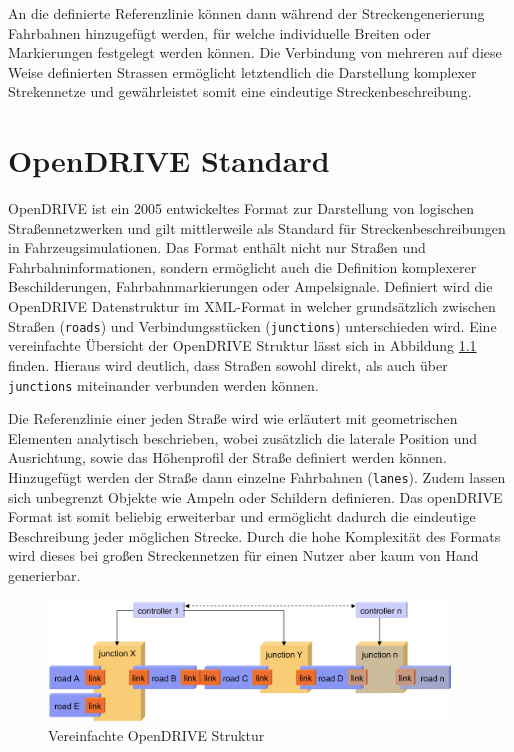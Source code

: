 An die definierte Referenzlinie können dann während der Streckengenerierung Fahrbahnen hinzugefügt werden, für welche individuelle Breiten oder Markierungen festgelegt werden können. Die Verbindung von mehreren auf diese Weise definierten Strassen ermöglicht letztendlich die Darstellung komplexer Strekennetze und gewährleistet somit eine eindeutige Streckenbeschreibung. 

\chapter{OpenDRIVE Standard}

OpenDRIVE ist ein 2005 entwickeltes Format zur Darstellung von logischen Straßennetzwerken und gilt mittlerweile als Standard für Streckenbeschreibungen in Fahrzeugsimulationen. Das Format enthält nicht nur Straßen und Fahrbahninformationen, sondern ermöglicht auch die Definition komplexerer Beschilderungen, Fahrbahnmarkierungen oder Ampelsignale. \cite{OpenDRIVE.2019} Definiert wird die OpenDRIVE Datenstruktur im XML-Format in welcher grundsätzlich zwischen Straßen (\texttt{roads}) und Verbindungsstücken (\texttt{junctions}) unterschieden wird. Eine vereinfachte Übersicht der OpenDRIVE Struktur lässt sich in Abbildung \ref{abb3} finden. Hieraus wird deutlich, dass Straßen sowohl direkt, als auch über \texttt{junctions} miteinander verbunden werden können. 

Die Referenzlinie einer jeden Straße wird wie erläutert mit geometrischen Elementen analytisch beschrieben, wobei zusätzlich die laterale Position und Ausrichtung, sowie das Höhenprofil der Straße definiert werden können. Hinzugefügt werden der Straße dann einzelne Fahrbahnen (\texttt{lanes}). Zudem lassen sich unbegrenzt Objekte wie Ampeln oder Schildern definieren. \cite{OpenDRIVEDoku.2019} Das openDRIVE Format ist somit beliebig erweiterbar und ermöglicht dadurch die eindeutige Beschreibung jeder möglichen Strecke. Durch die hohe Komplexität des Formats wird dieses bei großen Streckennetzen für einen Nutzer aber kaum von Hand generierbar.

\begin{figure}[H]
\flushleft
\includegraphics[width=0.95\textwidth]{fig/fig3.png}
\caption{Vereinfachte OpenDRIVE Struktur \cite{Dupuis.2006}}
\label{abb3}
\end{figure}


